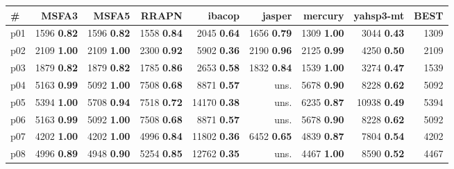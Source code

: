 \begin{tabular}{|l|rrrrrrr|r|}
\hline
\textbf{\#} & \textbf{MSFA3} & \textbf{MSFA5} & \textbf{RRAPN} & \textbf{ibacop} & \textbf{jasper} & \textbf{mercury} & \textbf{yahsp3-mt} & \textbf{BEST}\\
\hline
p01 & {\footnotesize 1596} \textbf{0.82} & {\footnotesize 1596} \textbf{0.82} & {\footnotesize 1558} \textbf{0.84} & {\footnotesize 2045} \textbf{0.64} & {\footnotesize 1656} \textbf{0.79} & {\footnotesize 1309} \textbf{1.00} & {\footnotesize 3044} \textbf{0.43} & 1309\\
p02 & {\footnotesize 2109} \textbf{1.00} & {\footnotesize 2109} \textbf{1.00} & {\footnotesize 2300} \textbf{0.92} & {\footnotesize 5902} \textbf{0.36} & {\footnotesize 2190} \textbf{0.96} & {\footnotesize 2125} \textbf{0.99} & {\footnotesize 4250} \textbf{0.50} & 2109\\
p03 & {\footnotesize 1879} \textbf{0.82} & {\footnotesize 1879} \textbf{0.82} & {\footnotesize 1785} \textbf{0.86} & {\footnotesize 2653} \textbf{0.58} & {\footnotesize 1832} \textbf{0.84} & {\footnotesize 1539} \textbf{1.00} & {\footnotesize 3274} \textbf{0.47} & 1539\\
p04 & {\footnotesize 5163} \textbf{0.99} & {\footnotesize 5092} \textbf{1.00} & {\footnotesize 7508} \textbf{0.68} & {\footnotesize 8871} \textbf{0.57} & uns. & {\footnotesize 5678} \textbf{0.90} & {\footnotesize 8228} \textbf{0.62} & 5092\\
p05 & {\footnotesize 5394} \textbf{1.00} & {\footnotesize 5708} \textbf{0.94} & {\footnotesize 7518} \textbf{0.72} & {\footnotesize 14170} \textbf{0.38} & uns. & {\footnotesize 6235} \textbf{0.87} & {\footnotesize 10938} \textbf{0.49} & 5394\\
p06 & {\footnotesize 5163} \textbf{0.99} & {\footnotesize 5092} \textbf{1.00} & {\footnotesize 7508} \textbf{0.68} & {\footnotesize 8871} \textbf{0.57} & uns. & {\footnotesize 5678} \textbf{0.90} & {\footnotesize 8228} \textbf{0.62} & 5092\\
p07 & {\footnotesize 4202} \textbf{1.00} & {\footnotesize 4202} \textbf{1.00} & {\footnotesize 4996} \textbf{0.84} & {\footnotesize 11802} \textbf{0.36} & {\footnotesize 6452} \textbf{0.65} & {\footnotesize 4839} \textbf{0.87} & {\footnotesize 7804} \textbf{0.54} & 4202\\
p08 & {\footnotesize 4996} \textbf{0.89} & {\footnotesize 4948} \textbf{0.90} & {\footnotesize 5254} \textbf{0.85} & {\footnotesize 12762} \textbf{0.35} & uns. & {\footnotesize 4467} \textbf{1.00} & {\footnotesize 8590} \textbf{0.52} & 4467\\

\end{tabular}
